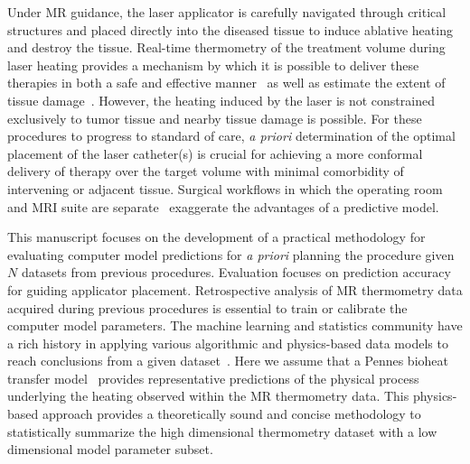 \documentclass[12pt]{article}
\begin{document}
Under MR guidance, the laser applicator is carefully navigated through
critical structures and placed directly into the diseased tissue to induce
ablative heating and destroy the tissue. 
Real-time thermometry of the treatment volume during
laser heating provides a mechanism by which it is possible to deliver
these therapies in both a safe and effective 
manner~\cite{rieke2008mr, denis2005magnetic,stafford2010magnetic,
woodrum2010feasibility} as well as estimate the extent of tissue
damage~\cite{hyperthermia2003basic,mcdannold2006uterine,mcnichols2004technical}. 
However, the heating induced by the laser is not constrained exclusively
to tumor tissue and nearby tissue damage is possible. 
For these procedures to progress to standard of care, 
\textit{a priori} determination of the optimal placement of the laser catheter(s) is crucial
for achieving a more conformal delivery of therapy over the target volume
with minimal comorbidity of intervening or adjacent tissue.
{\color{red}Surgical workflows in which the operating room and MRI suite are separate~\cite{Curry2012,Tovar-Spinoza2013}
exaggerate the advantages of a predictive model.}

This manuscript focuses on the development of a practical methodology for
evaluating computer model predictions for \textit{a priori} planning the procedure  
given $N$ datasets from previous procedures.
{\color{red} Evaluation focuses on prediction accuracy for guiding applicator placement.}
Retrospective analysis of MR thermometry data acquired during previous procedures is
essential to train or calibrate the computer model parameters. 
The machine learning and statistics community have a rich history in
applying various algorithmic and physics-based data models to reach conclusions from a
given dataset~\cite{Breiman2001,Hastie2005}. 
Here we assume that a Pennes bioheat transfer model~\cite{Pennes1948} provides
representative predictions of the  physical process underlying the heating
observed within the MR thermometry data.
This physics-based approach
provides a theoretically sound and concise methodology to statistically summarize the high
dimensional thermometry dataset with a low dimensional model parameter subset. 
\end{document}
